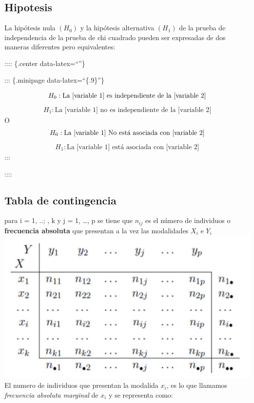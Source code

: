 \documentclass[twocolumn]{article}
\begin{document}
\subsection{Hipotesis}\label{hipotesis}

La hipótesis nula \((H_0)\) y la hipótesis alternativa \((H_1)\) de la
prueba de independencia de la prueba de chi cuadrado pueden ser
expresadas de dos maneras diferentes pero equivalentes:

:::: \{.center data-latex=``''\}

::: \{.minipage data-latex=``\{.9\linewidth\}''\}

\[
\begin{array}{c}
H_0 : \text{La [variable 1] es independiente de la [variable 2]}
\end{array} \\
\] \[
\begin{array}{c}
H_1 : \text{La [variable 1] no es independiente de la [variable 2]}
\end{array}
\] O \[
\begin{array}{c}
H_0 : \text{La [variable 1] No está asociada con  [variable 2]}
\end{array} \\
\] \[
\begin{array}{c}
H_1 : \text{La [variable 1] está asociada con [variable 2]}
\end{array}
\] :::

::::

\subsection{Tabla de contingencia}\label{tabla-de-contingencia}

para i = 1, ..; , k y j = 1, \ldots{}, p se tiene que \(n_{ij}\) es el
número de individuos o \textbf{frecuencia absoluta} que presentan a la
vez las modalidades \(X_i\) e \(Y_i\)
\includegraphics{./img/TablaDeContingencia.jpg} El numero de individuos
que presentan la modalida \(x_i\), es lo que llamamos \emph{frecuencia
absoluta marginal} de \(x_i\) y se representa como:
\end{document}
